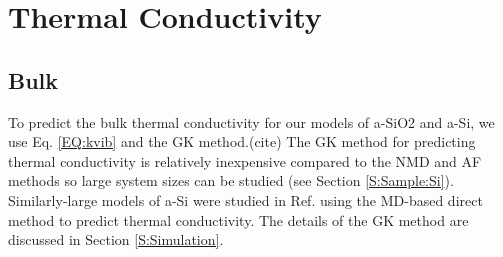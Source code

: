 \documentclass[aps,prb,onecolumn,preprint,superscriptaddress,footinbib,amsmath,amssymb,floatfix]{revtex4}
\begin{document}


\section{\label{S:Conductivity}Thermal Conductivity}

\subsection{\label{S:Bulk}Bulk}

To predict the bulk thermal conductivity for our models of a-SiO2 and 
a-Si, we use Eq. \eqref{EQ:kvib} 
and the GK method.(cite) The GK method for predicting 
thermal conductivity
is relatively inexpensive compared to the NMD and AF methods so  
large system sizes can be studied (see Section \ref{S:Sample:Si}).  
Similarly-large 
models of a-Si were studied in Ref.  using the 
MD-based direct method to predict thermal conductivity. The 
details of the GK method are discussed in Section \ref{S:Simulation}. 
\end{document}

